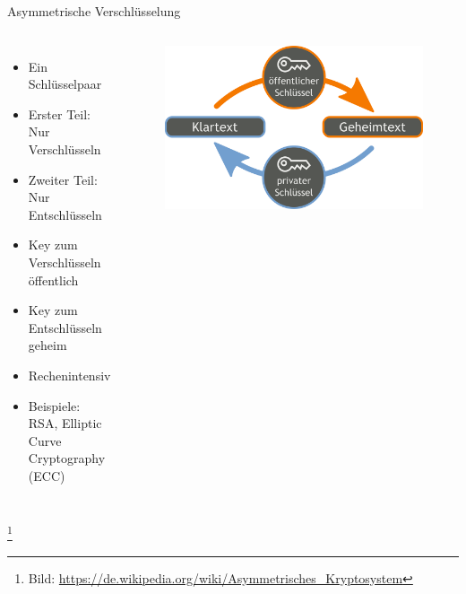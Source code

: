 \documentclass[10pt]{beamer}
\newcommand\blfootnote[1]{%
	\begingroup
	\renewcommand\thefootnote{}\footnote{#1}%
	\addtocounter{footnote}{-1}%
	\endgroup
}
\begin{document}
%
%
\begin{frame}[fragile]{Asymmetrische Verschlüsselung}
\begin{columns}[T,c,onlytextwidth]
	\begin{itemize}
		\item Ein Schlüsselpaar
		\item Erster Teil: Nur Verschlüsseln
		\item Zweiter Teil: Nur Entschlüsseln
		\item Key zum Verschlüsseln öffentlich
		\item Key zum Entschlüsseln geheim
		\item Rechenintensiv
		\item Beispiele: RSA, Elliptic Curve Cryptography (ECC)
	\end{itemize}
	\begin{figure}
		\includegraphics[width=1\textwidth]{images/asym}
	\end{figure}
\end{columns}
\blfootnote{Bild: \href{https://de.wikipedia.org/wiki/Asymmetrisches_Kryptosystem}{https://de.wikipedia.org/wiki/Asymmetrisches\_Kryptosystem}}
\end{frame}
\end{document}
